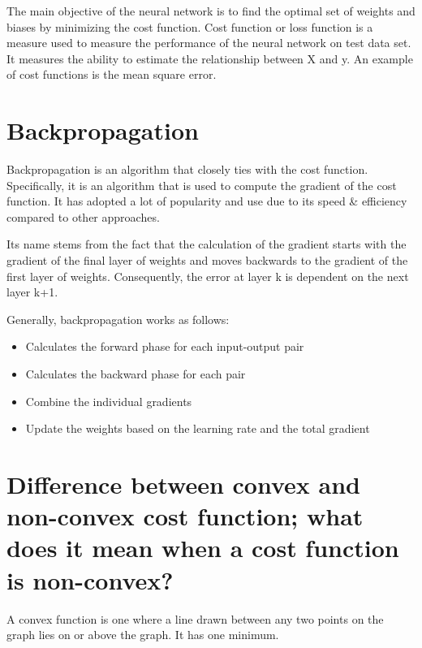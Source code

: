 \documentclass[
]{book}
\providecommand{\tightlist}{%
  \setlength{\itemsep}{0pt}\setlength{\parskip}{0pt}}
\begin{document}
The main objective of the neural network is to find the optimal set of weights and biases by minimizing the cost function. Cost function or loss function is a measure used to measure the performance of the neural network on test data set. It measures the ability to estimate the relationship between X and y. An example of cost functions is the mean square error.

\hypertarget{backpropagation}{%
\section{Backpropagation}\label{backpropagation}}

Backpropagation is an algorithm that closely ties with the cost function. Specifically, it is an algorithm that is used to compute the gradient of the cost function. It has adopted a lot of popularity and use due to its speed \& efficiency compared to other approaches.

Its name stems from the fact that the calculation of the gradient starts with the gradient of the final layer of weights and moves backwards to the gradient of the first layer of weights. Consequently, the error at layer k is dependent on the next layer k+1.

Generally, backpropagation works as follows:

\begin{itemize}
\tightlist
\item
  Calculates the forward phase for each input-output pair
\item
  Calculates the backward phase for each pair
\item
  Combine the individual gradients
\item
  Update the weights based on the learning rate and the total gradient
\end{itemize}

\hypertarget{difference-between-convex-and-non-convex-cost-function-what-does-it-mean-when-a-cost-function-is-non-convex}{%
\section{Difference between convex and non-convex cost function; what does it mean when a cost function is non-convex?}\label{difference-between-convex-and-non-convex-cost-function-what-does-it-mean-when-a-cost-function-is-non-convex}}

A convex function is one where a line drawn between any two points on the graph lies on or above the graph. It has one minimum.
\end{document}
